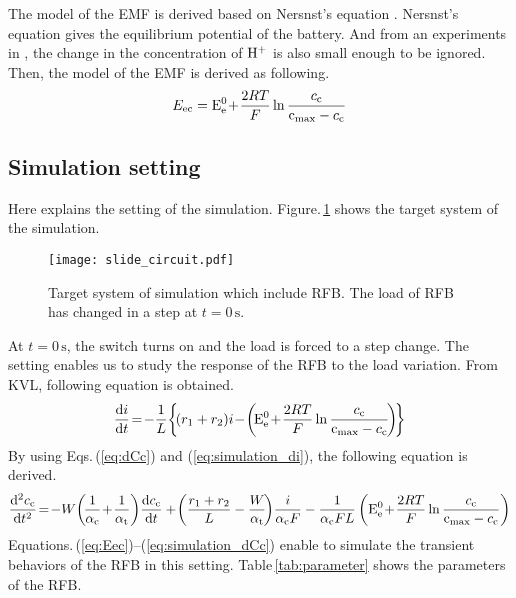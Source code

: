 \documentclass[a4paper]{article}
\newcommand{\tabref}[1]{Table\,\ref{#1}}
\newcommand{\eqsref}[2]{Eqs.\,(\ref{#1}) and (\ref{#2})}
\newcommand{\ifigref}[1]{Figure.\,\ref{#1}}
\newcommand{\ieqshref}[2]{Equations.\,(\ref{#1})--(\ref{#2})}
\renewcommand{\H}{{\rm H^{+}}}
\newcommand{\Cc}{c_{\rm c}}
\newcommand{\Cmax}{{\rm c_{max}}}
\newcommand{\ac}{\alpha_\mathrm{c}}
\newcommand{\at}{\alpha_\mathrm{t}}
\newcommand{\Eeo}{\mathrm{E_\mathrm{e}^0}}
\newcommand{\Eec}{E_\mathrm{ec}}
\newcommand{\odfrac}[2]{\frac{\mathrm{d}#1}{\mathrm{d}#2}}
\newcommand{\oddfrac}[3]{\frac{\mathrm{d}^{#1}#2}{\mathrm{d}#3^#1}}
\newcommand{\NRNST}[1]{\Eeo\!+\!\frac{2RT}{F}\ln\frac{#1}{\Cmax-#1}}
\begin{document}
The model of the EMF is derived based on Nersnst's equation \cite{nernst-equation-eng}. 
Nersnst's equation gives the equilibrium potential of the battery. 
And from an experiments in \cite{kazacos-mechanism-water-transfer}, 
the change in the concentration of $\H$ is also small enough to be ignored.
Then, the model of the EMF is derived as following. 
\begin{equation}
 \Eec=\NRNST{\Cc}\label{eq:Eec}
\end{equation}
\subsection{Simulation setting}\label{setting}
Here explains the setting of the simulation. 
\ifigref{fig:slide_circuit} shows the target system of the simulation.
\begin{figure}[h]
 \centering
 \texttt{[image: slide\_circuit.pdf]}
 \caption{Target system of simulation which include RFB. The load of RFB has changed in a step at $t=0\,\mathrm{s}$.}
 \label{fig:slide_circuit}
\end{figure}
At $t=0\,\mathrm{s}$, the switch turns on and the load is forced to a step change. 
The setting enables us to study the response of the RFB to the load variation. 
From KVL, following equation is obtained. 
\begin{equation}
 \odfrac{i}{t}\!=\!-\frac{1}{L}\!\left\{\!(r_1+r_2)i\!-\!\left(\!\NRNST{\Cc}\!\right)\!\right\}\label{eq:simulation_di}
\end{equation}
By using \eqsref{eq:dCc}{eq:simulation_di}, the following equation is derived.
\begin{equation}
 \oddfrac{2}{\Cc}{t}\!=\!-W\!\left(\!\frac{1}{\ac}\!+\!\frac{1}{\at}\right)\!\odfrac{\Cc}{t}
 +\!\left(\frac{r_1+r_2}{L}-\frac{W}{\at}\!\right)\!\frac{i}{\ac F}
 -\frac{1}{\ac FL}\left(\NRNST{\Cc}\right)\label{eq:simulation_dCc}
\end{equation}
\ieqshref{eq:Eec}{eq:simulation_dCc} enable to simulate the transient behaviors of the RFB in this setting. 
\tabref{tab:parameter} shows the parameters of the RFB. 
\end{document}
